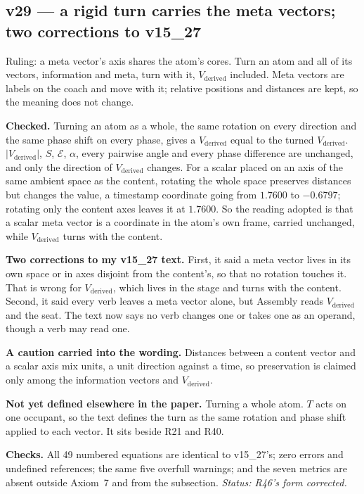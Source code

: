 \documentclass[11pt]{article}
\begin{document}
\subsection*{v29 --- a rigid turn carries the meta vectors; two corrections to v15\_27}
Ruling: a meta vector's axis shares the atom's cores. Turn an atom and all
of its vectors, information and meta, turn with it, $V_{\text{derived}}$
included. Meta vectors are labels on the coach and move with it; relative
positions and distances are kept, so the meaning does not change.

\textbf{Checked.} Turning an atom as a whole, the same rotation on every
direction and the same phase shift on every phase, gives a
$V_{\text{derived}}$ equal to the turned $V_{\text{derived}}$.
$|V_{\text{derived}}|$, $S$, $\mathcal{E}$, $\alpha$, every pairwise angle
and every phase difference are unchanged, and only the direction of
$V_{\text{derived}}$ changes. For a scalar placed on an axis of the same
ambient space as the content, rotating the whole space preserves distances
but changes the value, a timestamp coordinate going from $1.7600$ to
$-0.6797$; rotating only the content axes leaves it at $1.7600$. So the
reading adopted is that a scalar meta vector is a coordinate in the atom's
own frame, carried unchanged, while $V_{\text{derived}}$ turns with the
content.

\textbf{Two corrections to my v15\_27 text.} First, it said a meta vector
lives in its own space or in axes disjoint from the content's, so that no
rotation touches it. That is wrong for $V_{\text{derived}}$, which lives
in the stage and turns with the content. Second, it said every verb leaves
a meta vector alone, but Assembly reads $V_{\text{derived}}$ and the seat.
The text now says no verb changes one or takes one as an operand, though a
verb may read one.

\textbf{A caution carried into the wording.} Distances between a content
vector and a scalar axis mix units, a unit direction against a time, so
preservation is claimed only among the information vectors and
$V_{\text{derived}}$.

\textbf{Not yet defined elsewhere in the paper.} Turning a whole atom.
$T$ acts on one occupant, so the text defines the turn as the same
rotation and phase shift applied to each vector. It sits beside R21 and
R40.

\textbf{Checks.} All 49 numbered equations are identical to v15\_27's;
zero errors and undefined references; the same five overfull warnings; and
the seven metrics are absent outside Axiom~7 and from the subsection.
\emph{Status: R46's form corrected.}
\end{document}
